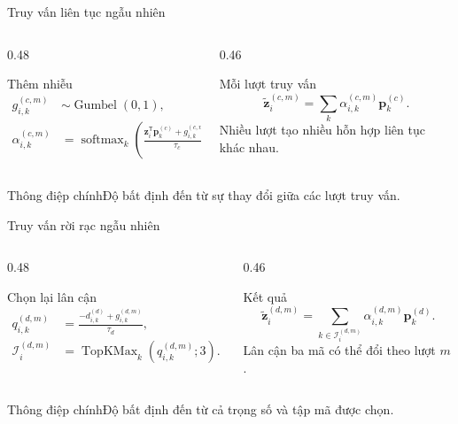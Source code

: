 \documentclass[aspectratio=169]{beamer}
\newcommand{\takeaway}[1]{\begin{alertblock}{Thông điệp chính}#1\end{alertblock}}
\begin{document}
\begin{frame}{Truy vấn liên tục ngẫu nhiên}
  \begin{columns}[T,onlytextwidth]
    \begin{column}{0.48\textwidth}\begin{block}{Thêm nhiễu}\[\begin{aligned} g^{(c,m)}_{i,k}&\sim\operatorname{Gumbel}(0,1),\\ \alpha^{(c,m)}_{i,k}&=\operatorname{softmax}_k\left(\frac{\mathbf z_i^\mathsf T\mathbf p_k^{(c)}+g^{(c,m)}_{i,k}}{\tau_c}\right). \end{aligned}\]\end{block}\end{column}
    \begin{column}{0.46\textwidth}\begin{exampleblock}{Mỗi lượt truy vấn}\[\widetilde{\mathbf z}^{(c,m)}_i=\sum_k\alpha^{(c,m)}_{i,k}\mathbf p_k^{(c)}.\]\small Nhiều lượt tạo nhiều hỗn hợp liên tục khác nhau.\end{exampleblock}\end{column}
  \end{columns}
  \takeaway{Độ bất định đến từ sự thay đổi giữa các lượt truy vấn.}
\end{frame}

\begin{frame}{Truy vấn rời rạc ngẫu nhiên}
  \begin{columns}[T,onlytextwidth]
    \begin{column}{0.48\textwidth}\begin{block}{Chọn lại lân cận}\[\begin{aligned} q^{(d,m)}_{i,k}&=\frac{-d^{(d)}_{i,k}+g^{(d,m)}_{i,k}}{\tau_d},\\ \mathcal I_i^{(d,m)}&=\operatorname{TopKMax}_k(q^{(d,m)}_{i,k};3). \end{aligned}\]\end{block}\end{column}
    \begin{column}{0.46\textwidth}\begin{exampleblock}{Kết quả}\[\widetilde{\mathbf z}^{(d,m)}_i=\sum_{k\in\mathcal I_i^{(d,m)}}\alpha^{(d,m)}_{i,k}\mathbf p_k^{(d)}.\]\small Lân cận ba mã có thể đổi theo lượt \(m\).\end{exampleblock}\end{column}
  \end{columns}
  \takeaway{Độ bất định đến từ cả trọng số và tập mã được chọn.}
\end{frame}
\end{document}
